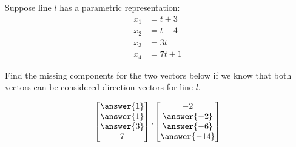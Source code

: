 \documentclass{ximera}
\begin{document}
  \begin{problem}\label{prob:directionvect2}
  Suppose line $l$ has a parametric representation:
  \begin{align*}
  x_1&=t+3\\
  x_2&=t-4\\
  x_3&=3t\\
  x_4&=7t+1
  \end{align*}
   
  Find the missing components for the two vectors below if we know that both vectors can be considered  direction vectors for line $l$.
   
  $$\begin{bmatrix}\answer{1}\\\answer{1}\\\answer{3}\\7\end{bmatrix},\begin{bmatrix}-2\\\answer{-2}\\\answer{-6}\\\answer{-14}\end{bmatrix}$$
  \end{problem}
  
\end{document}
